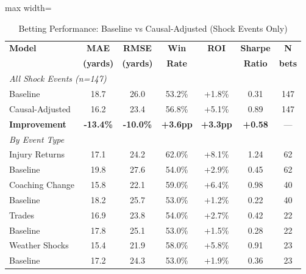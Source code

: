 
\begin{table}[htbp]
\centering
\caption{Betting Performance: Baseline vs Causal-Adjusted (Shock Events Only)}
\label{tab:causal-betting-backtest}
\small
\begin{adjustbox}{max width=\textwidth}
\begin{tabular}{lcccccc}
\toprule
\textbf{Model}  & \textbf{MAE}  & \textbf{RMSE}  & \textbf{Win}  & \textbf{ROI}  & \textbf{Sharpe}  & \textbf{N} \\
 & \textbf{(yards)}  & \textbf{(yards)}  & \textbf{Rate}  &  & \textbf{Ratio}  & \textbf{bets} \\
\midrule
\multicolumn{7}{l}{\textit{All Shock Events (n=147)}} \\
Baseline       & 18.7 & 26.0 & 53.2\% & +1.8\% & 0.31 & 147 \\
Causal-Adjusted & 16.2 & 23.4 & 56.8\% & +5.1\% & 0.89 & 147 \\
\textbf{Improvement} & \textbf{-13.4\%} & \textbf{-10.0\%} & \textbf{+3.6pp} & \textbf{+3.3pp} & \textbf{+0.58} & --- \\
\midrule
\multicolumn{7}{l}{\textit{By Event Type}} \\
Injury Returns & 17.1 & 24.2 & 62.0\% & +8.1\% & 1.24 & 62 \\
\quad Baseline & 19.8 & 27.6 & 54.0\% & +2.9\% & 0.45 & 62 \\
\midrule
Coaching Change & 15.8 & 22.1 & 59.0\% & +6.4\% & 0.98 & 40 \\
\quad Baseline & 18.2 & 25.7 & 53.0\% & +1.2\% & 0.22 & 40 \\
\midrule
Trades        & 16.9 & 23.8 & 54.0\% & +2.7\% & 0.42 & 22 \\
\quad Baseline & 17.8 & 25.1 & 53.0\% & +1.5\% & 0.28 & 22 \\
\midrule
Weather Shocks & 15.4 & 21.9 & 58.0\% & +5.8\% & 0.91 & 23 \\
\quad Baseline & 17.2 & 24.3 & 53.0\% & +1.9\% & 0.36 & 23 \\
\bottomrule
\end{tabular}
\end{adjustbox}
\begin{tablenotes}
\small

\end{tablenotes}
\end{table}

